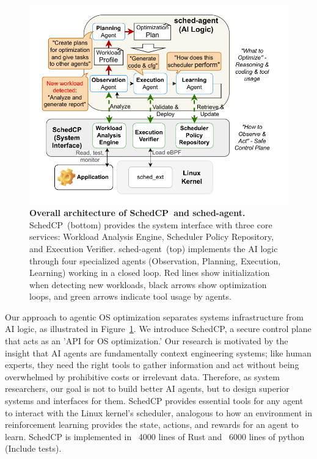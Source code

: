 \documentclass[preprint]{article}
\newcommand{\sys}{SchedCP\xspace}
\newcommand{\agent}{sched-agent\xspace}
\begin{document}
\begin{figure}
    \centering
    \includegraphics[width=\columnwidth]{sections/img/arch-scheddcp.pdf}
    \caption{
        \textbf{Overall architecture of \sys\ and \agent.} 
        \sys\ (bottom) provides the system interface with three core services: Workload Analysis Engine, Scheduler Policy Repository, and Execution Verifier.
        \agent\ (top) implements the AI logic through four specialized agents (Observation, Planning, Execution, Learning) working in a closed loop. Red lines show initialization when detecting new workloads, black arrows show optimization loops, and green arrows indicate tool usage by agents.
    }
    \label{fig:frameworkarch}
\end{figure}

Our approach to agentic OS optimization separates systems infrastructure from AI logic, as illustrated in Figure~\ref{fig:frameworkarch}. We introduce \sys, a secure control plane that acts as an 'API for OS optimization.' Our research is motivated by the insight that AI agents are fundamentally context engineering systems; like human experts, they need the right tools to gather information and act without being overwhelmed by prohibitive costs or irrelevant data. Therefore, as system researchers, our goal is not to build better AI agents, but to design superior systems and interfaces for them. \sys provides essential tools for any agent to interact with the Linux kernel's scheduler, analogous to how an environment in reinforcement learning provides the state, actions, and rewards for an agent to learn. \sys is implemented in ~4000 lines of Rust and ~6000 lines of python (Include tests).
\end{document}
